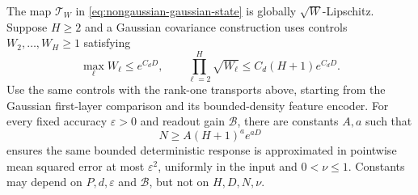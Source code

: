 \begin{lemma}
\label{lem:nongaussian-global-transfer}
The map $\mathcal T_W$ in
\eqref{eq:nongaussian-gaussian-state} is globally $\sqrt W$-Lipschitz.
Suppose $H\ge2$ and a Gaussian covariance construction uses controls
$W_2,\ldots,W_H\ge1$ satisfying
\begin{equation}
 \max_\ell W_\ell\le e^{C_dD},\qquad
 \prod_{\ell=2}^H\sqrt{W_\ell}\le C_d(H+1)e^{C_dD}.
 \label{eq:control-product-bounds}
\end{equation}
Use the same controls with the rank-one transports above, starting
from the Gaussian first-layer comparison and its bounded-density
feature encoder. For every fixed accuracy $\varepsilon>0$ and
readout gain $\mathcal B$, there are constants $A,a$ such that
\begin{equation}
 N\ge A(H+1)^a e^{aD}
 \label{eq:nongaussian-polynomial-width}
\end{equation}
ensures the same bounded deterministic response is approximated in
pointwise mean squared error at most $\varepsilon^2$, uniformly in
the input and $0<\nu\le1$. Constants may depend on $P,d,\varepsilon$
and $\mathcal B$, but not on $H,D,N,\nu$.
\end{lemma}

